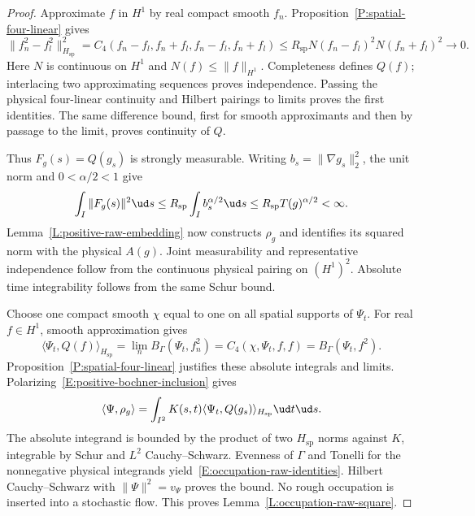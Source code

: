 \begin{proof}
  Approximate $f$ in $H^1$ by real compact smooth $f_n$.
  Proposition~\ref{P:spatial-four-linear} gives
  \[
    \|f_n^2-f_l^2\|_{H_{\mathrm{sp}}}^2
    =C_4(f_n-f_l,f_n+f_l,f_n-f_l,f_n+f_l)
    \le R_{\mathrm{sp}}N(f_n-f_l)^2N(f_n+f_l)^2\to0.
  \]
  Here $N$ is continuous on $H^1$ and $N(f)\le\|f\|_{H^1}$.
  Completeness defines $Q(f)$; interlacing two approximating sequences
  proves independence. Passing the physical four-linear continuity
  and Hilbert pairings to limits proves the first identities.
  The same difference bound, first for smooth approximants and then
  by passage to the limit, proves continuity of $Q$.

  Thus $F_g(s)=Q(g_s)$ is strongly measurable.
  Writing $b_s=\|\nabla g_s\|_2^2$, the unit norm and
  $0<\alpha/2<1$ give
  \[
    \int_I\|F_g(s)\|^2\ud s
    \le R_{\mathrm{sp}}\int_I b_s^{\alpha/2}\ud s
    \le R_{\mathrm{sp}}T(g)^{\alpha/2}<\infty .
  \]
  Lemma~\ref{L:positive-raw-embedding} now constructs $\rho_g$ and
  identifies its squared norm with the physical $A(g)$.
  Joint measurability and representative independence follow from
  the continuous physical pairing on $(H^1)^2$.
  Absolute time integrability follows from the same Schur bound.

  Choose one compact smooth $\chi$ equal to one on all spatial
  supports of $\Psi_t$. For real $f\in H^1$, smooth approximation gives
  \[
    \langle\Psi_t,Q(f)\rangle_{H_{\mathrm{sp}}}
    =\lim_n B_\Gamma(\Psi_t,f_n^2)
    =C_4(\chi,\Psi_t,f,f)=B_\Gamma(\Psi_t,f^2).
  \]
  Proposition~\ref{P:spatial-four-linear} justifies these absolute
  integrals and limits.
  Polarizing~\eqref{E:positive-bochner-inclusion} gives
  \[
    \langle\Psi,\rho_g\rangle
    =\int_{I^2}K(s,t)\langle\Psi_t,Q(g_s)\rangle_{H_{\mathrm{sp}}}
    \ud t\ud s .
  \]
  The absolute integrand is bounded by the product of two
  $H_{\mathrm{sp}}$ norms against $K$, integrable by Schur and
  $L^2$ Cauchy--Schwarz.
  Evenness of $\Gamma$ and Tonelli for the nonnegative physical
  integrands yield~\eqref{E:occupation-raw-identities}.
  Hilbert Cauchy--Schwarz with $\|\Psi\|^2=v_\Psi$ proves the bound.
  No rough occupation is inserted into a stochastic flow.
  This proves Lemma~\ref{L:occupation-raw-square}.
\end{proof}


